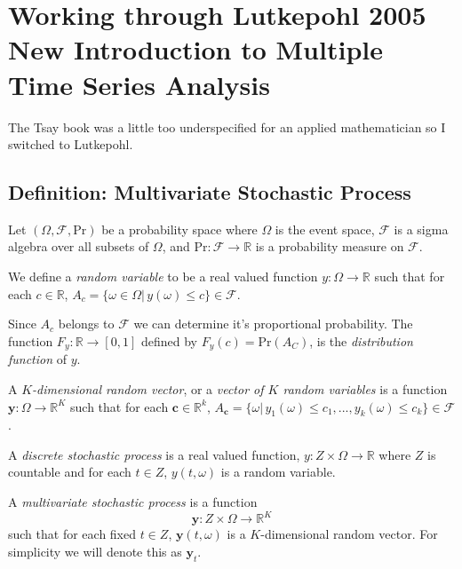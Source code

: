 \documentclass{article}
\begin{document}
    \section{Working through Lutkepohl 2005 New Introduction to Multiple
    Time Series Analysis}

        The Tsay book was a little too underspecified for an applied 
        mathematician so I switched to Lutkepohl.

        \subsection{Definition: Multivariate Stochastic Process}

            Let $(\Omega, \mathcal{F}, \text{Pr})$ be a probability space where 
            $\Omega$ is the event space, 
            $\mathcal{F}$ is a sigma algebra over all subsets of $\Omega$,
            and $\text{Pr}: \mathcal{F} \rightarrow \mathbb{R}$ is a probability 
            measure on $\mathcal{F}$.

            We define a \textit{random variable} to be a real valued
            function $y: \Omega \rightarrow \mathbb{R}$ such that for each 
            $c \in \mathbb{R}$, 
            $A_c = \{\omega \in \Omega | \, y(\omega) \leq c\} \in \mathcal{F}$.
            
            Since $A_c$ belongs to $\mathcal{F}$ we can determine it's proportional
            probability. The
            function $F_y: \mathbb{R} \rightarrow [0,1]$ defined by 
            $F_y(c) = \text{Pr}(A_C)$, is the \textit{distribution function} of $y$.

            A \textit{$K$-dimensional random vector}, or a 
            \textit{vector of $K$ random variables}
            is a function $\bm{y}: \Omega \rightarrow \mathbb{R}^K$ such that
            for each $\bm{c} \in \mathbb{R}^k$, 
            $A_{\bm{c}} = \{\omega | \, y_1(\omega) \leq c_1, ... , y_k(\omega) 
            \leq c_k\} \in \mathcal{F}$. 

            A \textit{discrete stochastic process} is a real valued function, 
            $y: Z \times \Omega \rightarrow \mathbb{R}$ where $Z$ is countable and
            for each $t \in Z$, $y(t, \omega)$ is a random variable.

            A \textit{multivariate stochastic process} is a function
            \[
                \bm{y}: Z \times \Omega \rightarrow \mathbb{R}^K
            \]
            such that for each fixed $t \in Z$, $\bm{y}(t, \omega)$ is a
            $K$-dimensional random vector. For simplicity we will denote
            this as $\bm{y}_t$.
\end{document}
